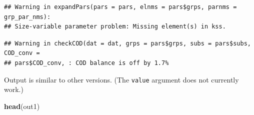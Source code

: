 \documentclass[
]{article}
\newenvironment{Shaded}{\begin{snugshade}}{\end{snugshade}}
\newcommand{\FunctionTok}[1]{\textcolor[rgb]{0.13,0.29,0.53}{\textbf{#1}}}
\newcommand{\NormalTok}[1]{#1}
\begin{document}
\begin{verbatim}
## Warning in expandPars(pars = pars, elnms = pars$grps, parnms = grp_par_nms):
## Size-variable parameter problem: Missing element(s) in kss.
\end{verbatim}

\begin{verbatim}
## Warning in checkCOD(dat = dat, grps = pars$grps, subs = pars$subs, COD_conv =
## pars$COD_conv, : COD balance is off by 1.7%
\end{verbatim}

Output is similar to other versions. (The \texttt{value} argument does
not currently work.)

\begin{Shaded}
\begin{Highlighting}[]
\FunctionTok{head}\NormalTok{(out1)}
\end{Highlighting}
\end{Shaded}
\end{document}
